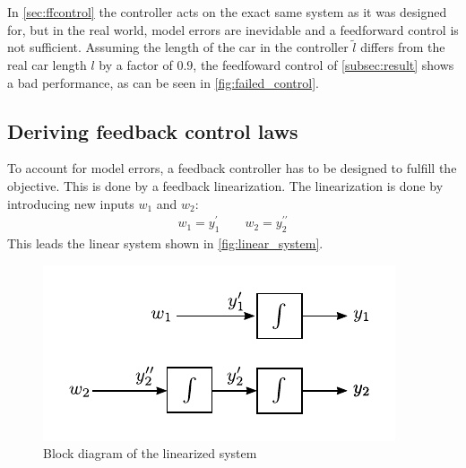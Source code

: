 \documentclass[a4paper,11pt,headings=standardclasses,parskip=half]{scrartcl}
\begin{document}
In \autoref{sec:ffcontrol} the controller acts on the exact same system as it was designed for, but in the real world, model errors are inevidable and a feedforward control is not sufficient. Assuming the length of the car in the controller $\tilde{l}$ differs from the real car length $l$ by a factor of $0.9$, the feedfoward control of \ref{subsec:result} shows a bad performance, as can be seen in \autoref{fig:failed_control}. 
\subsection{Deriving feedback control laws}
To account for model errors, a feedback controller has to be designed to fulfill the objective. This is done by a feedback linearization.
The linearization is done by introducing new inputs $w_1$ and $w_2$:
\begin{align}
\label{eq:new_inputs}
w_1 = y_1^\prime \qquad w_2 = y_2^{\prime\prime}
\end{align}
This leads the linear system shown in \autoref{fig:linear_system}. 
\begin{figure}[ht]
\centering
\includegraphics[scale=1]{img/linear_system.pdf}
\caption{Block diagram of the linearized system}
\label{fig:linear_system}
\end{figure}
\end{document}
